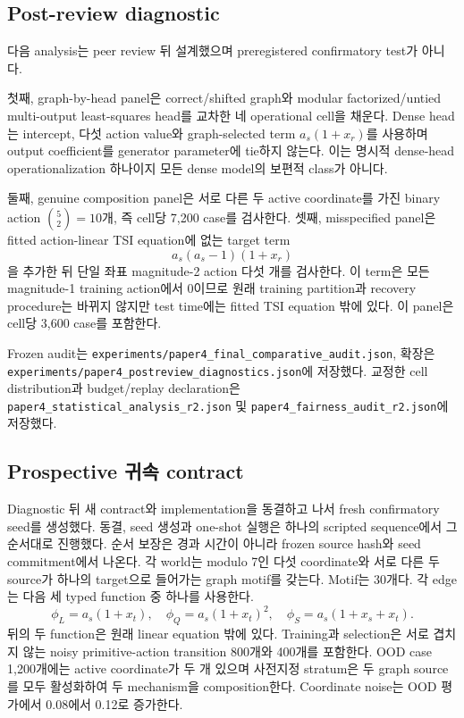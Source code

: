 \subsection{Post-review diagnostic}

다음 analysis는 peer review 뒤 설계했으며 preregistered confirmatory test가 아니다.

첫째, graph-by-head panel은 correct/shifted graph와 modular factorized/untied
multi-output least-squares head를 교차한 네 operational cell을 채운다. Dense head는
intercept, 다섯 action value와 graph-selected term \(a_s(1+x_r)\)를 사용하며 output
coefficient를 generator parameter에 tie하지 않는다. 이는 명시적 dense-head
operationalization 하나이지 모든 dense model의 보편적 class가 아니다.

둘째, genuine composition panel은 서로 다른 두 active coordinate를 가진 binary
action \(\binom{5}{2}=10\)개, 즉 cell당 7,200 case를 검사한다. 셋째,
misspecified panel은 fitted action-linear TSI equation에 없는 target term
\[
a_s(a_s-1)(1+x_r)
\]
을 추가한 뒤 단일 좌표 magnitude-2 action 다섯 개를 검사한다. 이 term은 모든
magnitude-1 training action에서 0이므로 원래 training partition과 recovery
procedure는 바뀌지 않지만 test time에는 fitted TSI equation 밖에 있다. 이 panel은
cell당 3,600 case를 포함한다.

Frozen audit는
\texttt{experiments/paper4\_final\_comparative\_audit.json}, 확장은
\texttt{experiments/paper4\_postreview\_diagnostics.json}에 저장했다. 교정한
cell distribution과 budget/replay declaration은
\texttt{paper4\_statistical\_analysis\_r2.json} 및
\texttt{paper4\_fairness\_audit\_r2.json}에 저장했다.

\subsection{Prospective 귀속 contract}

Diagnostic 뒤 새 contract와 implementation을 동결하고 나서 fresh confirmatory
seed를 생성했다. 동결, seed 생성과 one-shot 실행은 하나의 scripted sequence에서
그 순서대로 진행했다. 순서 보장은 경과 시간이 아니라 frozen source hash와 seed
commitment에서 나온다. 각 world는 modulo 7인 다섯 coordinate와 서로 다른 두 source가
하나의 target으로 들어가는 graph motif를 갖는다. Motif는 30개다. 각 edge는 다음
세 typed function 중 하나를 사용한다.
\[
\phi_L=a_s(1+x_t),\quad
\phi_Q=a_s(1+x_t)^2,\quad
\phi_S=a_s(1+x_s+x_t).
\]
뒤의 두 function은 원래 linear equation 밖에 있다. Training과 selection은 서로
겹치지 않는 noisy primitive-action transition 800개와 400개를 포함한다. OOD case
1,200개에는 active coordinate가 두 개 있으며 사전지정 stratum은 두 graph source를
모두 활성화하여 두 mechanism을 composition한다. Coordinate noise는 OOD 평가에서
0.08에서 0.12로 증가한다.

